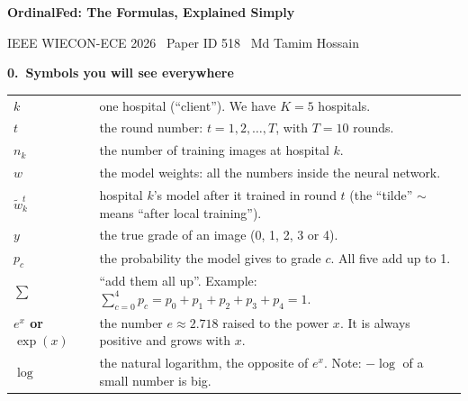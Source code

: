 \documentclass[11pt,a4paper]{article}
\newcommand{\formula}[3]{%
  \par\needspace{10\baselineskip}\bigskip\noindent
  {\color{accent}\Large\bfseries #1.\ #2}\hfill{\color{muted}\small #3}\par\smallskip}
\begin{document}
{\color{navy}\LARGE\bfseries OrdinalFed: The Formulas, Explained Simply}\par\smallskip
{\color{muted}IEEE WIECON-ECE 2026 \textperiodcentered\ Paper ID 518 \textperiodcentered\ Md Tamim Hossain}

\medskip
{}

\formula{0}{Symbols you will see everywhere}{}
\begin{center}\small
\begin{tabular}{@{}>{\bfseries}l p{12.5cm}@{}}
\toprule
$k$ & one hospital (``client''). We have $K = 5$ hospitals.\\
$t$ & the round number: $t = 1, 2, \dots, T$, with $T = 10$ rounds.\\
$n_k$ & the number of training images at hospital $k$.\\
$w$ & the model weights: all the numbers inside the neural network.\\
$\tilde{w}_k^t$ & hospital $k$'s model after it trained in round $t$ (the ``tilde'' $\sim$ means ``after local training'').\\
$y$ & the true grade of an image (0, 1, 2, 3 or 4).\\
$p_c$ & the probability the model gives to grade $c$. All five add up to 1.\\
$\sum$ & ``add them all up''. Example: $\sum_{c=0}^{4} p_c = p_0 + p_1 + p_2 + p_3 + p_4 = 1$.\\
$e^{x}$ or $\exp(x)$ & the number $e \approx 2.718$ raised to the power $x$. It is always positive and grows with $x$.\\
$\log$ & the natural logarithm, the opposite of $e^x$. Note: $-\log$ of a small number is big.\\
\bottomrule
\end{tabular}
\end{center}
\end{document}
